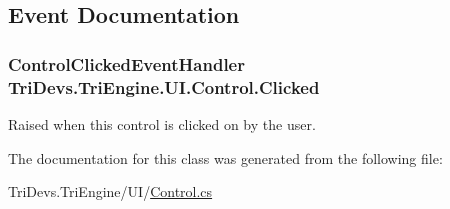 \subsection{Event Documentation}
\hypertarget{class_tri_devs_1_1_tri_engine_1_1_u_i_1_1_control_a9a6b05f8c942acf72c13c34a41397579}{
\subsubsection[{Clicked}]{\setlength{\rightskip}{0pt plus 5cm}Control\-Clicked\-Event\-Handler Tri\-Devs.\-Tri\-Engine.\-U\-I.\-Control.\-Clicked}}\label{class_tri_devs_1_1_tri_engine_1_1_u_i_1_1_control_a9a6b05f8c942acf72c13c34a41397579}


Raised when this control is clicked on by the user. 



The documentation for this class was generated from the following file\-:\begin{DoxyCompactItemize}
\item 
Tri\-Devs.\-Tri\-Engine/\-U\-I/\hyperlink{_control_8cs}{Control.\-cs}\end{DoxyCompactItemize}
